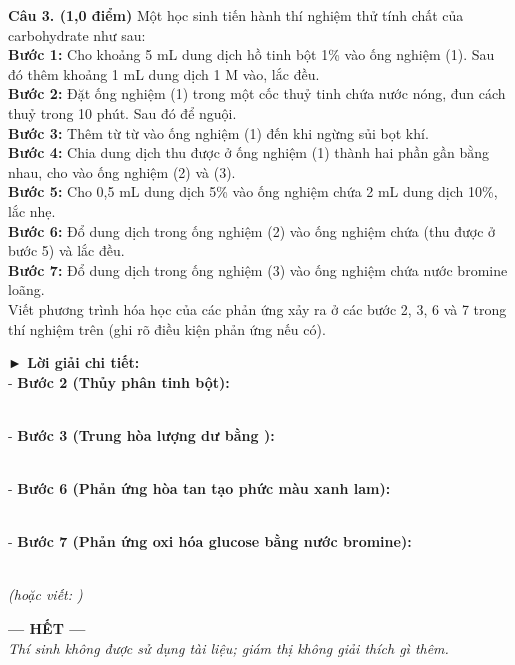 \documentclass[11pt,a4paper]{article}
\begin{document}
\vspace{6pt}
\noindent\textbf{Câu 3. (1,0 điểm)} Một học sinh tiến hành thí nghiệm thử tính chất của carbohydrate như sau:\\
\textbf{Bước 1:} Cho khoảng 5 mL dung dịch hồ tinh bột 1\% vào ống nghiệm (1). Sau đó thêm khoảng 1 mL dung dịch  1 M vào, lắc đều.\\
\textbf{Bước 2:} Đặt ống nghiệm (1) trong một cốc thuỷ tinh chứa nước nóng, đun cách thuỷ trong 10 phút. Sau đó để nguội.\\
\textbf{Bước 3:} Thêm từ từ  vào ống nghiệm (1) đến khi ngừng sủi bọt khí.\\
\textbf{Bước 4:} Chia dung dịch thu được ở ống nghiệm (1) thành hai phần gần bằng nhau, cho vào ống nghiệm (2) và (3).\\
\textbf{Bước 5:} Cho 0,5 mL dung dịch  5\% vào ống nghiệm chứa 2 mL dung dịch  10\%, lắc nhẹ.\\
\textbf{Bước 6:} Đổ dung dịch trong ống nghiệm (2) vào ống nghiệm chứa  (thu được ở bước 5) và lắc đều.\\
\textbf{Bước 7:} Đổ dung dịch trong ống nghiệm (3) vào ống nghiệm chứa nước bromine loãng.\\
Viết phương trình hóa học của các phản ứng xảy ra ở các bước 2, 3, 6 và 7 trong thí nghiệm trên (ghi rõ điều kiện phản ứng nếu có).

\begin{tcolorbox}[colback=white,colframe=solBlue,arc=1mm,boxrule=0.5pt,top=2mm,bottom=2mm,left=3mm,right=3mm]
{\color{solBlue}\textbf{► Lời giải chi tiết:}}\\
- \textbf{Bước 2 (Thủy phân tinh bột):}\\
\centerline{}\\
- \textbf{Bước 3 (Trung hòa lượng  dư bằng ):}\\
\centerline{}\\
- \textbf{Bước 6 (Phản ứng hòa tan  tạo phức màu xanh lam):}\\
\centerline{}\\
- \textbf{Bước 7 (Phản ứng oxi hóa glucose bằng nước bromine):}\\
\centerline{}\\
\textit{(hoặc viết: )}
\end{tcolorbox}

\vspace{8pt}
\begin{center}
\textbf{--- HẾT ---} \\
\textit{\small Thí sinh không được sử dụng tài liệu; giám thị không giải thích gì thêm.}
\end{center}
\end{document}
